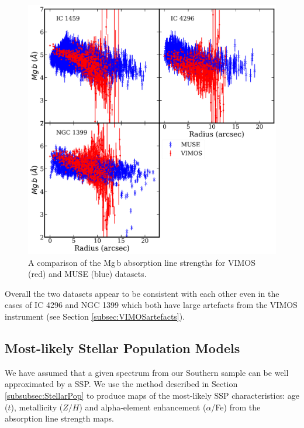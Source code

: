 			\begin{figure}[t!]
				\centering
				\includegraphics[width=.9\textwidth]{chapter4/compare_Mgb.png}
				\caption[Comparison between Mg\,b radial profiles from VIMOS and MUSE datacubes]{A comparison of the Mg\,b absorption line strengths for VIMOS (red) and MUSE (blue) datasets.}
				\label{fig:compare_mgbprofile}
			\end{figure}

			Overall the two datasets appear to be consistent with each other even in the cases of IC 4296 and NGC 1399 which both have large artefacts from the VIMOS instrument (see Section \ref{subsec:VIMOSartefacts}). 


	\subsection{Most-likely Stellar Population Models}
		\label{subsec:ssp}
		We have assumed that a given spectrum from our Southern sample can be well approximated by a SSP. We use the method described in Section \ref{subsubsec:StellarPop} to produce maps of the most-likely SSP characteristics: age ($t$), metallicity ($Z/H$) and alpha-element enhancement ($\alpha$/Fe) from the absorption line strength maps. 


